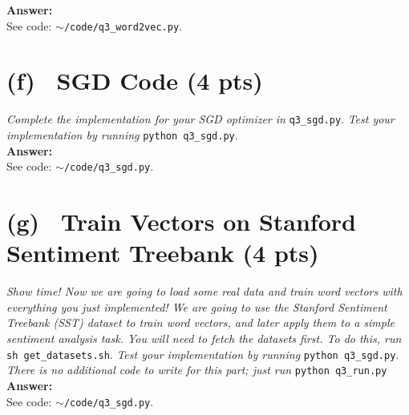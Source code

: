 \documentclass[fleqn]{MJD}
\newcommand{\subproblem}[2]{\section{(#1)~ #2}}
\newcommand{\0}{\emptyset}
\begin{document}
\noindent \textbf{Answer:} \\

\noindent See code: $\sim$\verb|/code/q3_word2vec.py|.


\subproblem{f}{SGD Code (4 pts)}
\textit{Complete the implementation for your SGD optimizer in }\verb|q3_sgd.py|. \textit{Test your implementation by running} \verb|python q3_sgd.py|. \\


\noindent \textbf{Answer:} \\

\noindent See code: $\sim$\verb|/code/q3_sgd.py|.


\subproblem{g}{Train Vectors on Stanford Sentiment Treebank (4 pts)}
\textit{Show time! Now we are going to load some real data and train word vectors with everything you just implemented! We are going to use the Stanford Sentiment Treebank (SST) dataset to train word vectors, and later apply them to a simple sentiment analysis task. You will need to fetch the datasets first. To do this, run }\verb|sh get_datasets.sh|. \textit{Test your implementation by running} \verb|python q3_sgd.py|. \textit{There is no additional code to write for this part; just run }\verb|python q3_run.py| \\


\noindent \textbf{Answer:} \\

\noindent See code: $\sim$\verb|/code/q3_sgd.py|.
\end{document}
